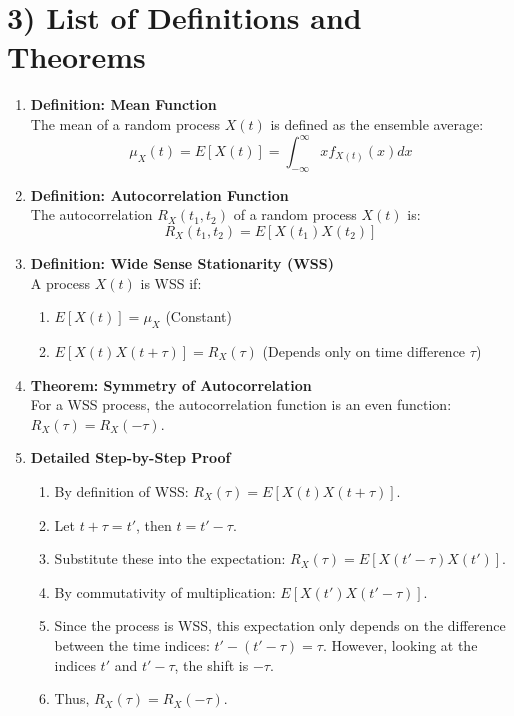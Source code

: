 \documentclass[11pt]{article}
\begin{document}
\section*{3) List of Definitions and Theorems} 
\begin{enumerate}
    \item \textbf{Definition: Mean Function} \\
    The mean of a random process $X(t)$ is defined as the ensemble average:
    \[ \mu_X(t) = E[X(t)] = \int_{-\infty}^{\infty} x f_{X(t)}(x) dx \]

    \item \textbf{Definition: Autocorrelation Function} \\
    The autocorrelation $R_X(t_1, t_2)$ of a random process $X(t)$ is:
    \[ R_X(t_1, t_2) = E[X(t_1)X(t_2)] \]

    \item \textbf{Definition: Wide Sense Stationarity (WSS)} \\
    A process $X(t)$ is WSS if:
    \begin{enumerate}
        \item[1.] $E[X(t)] = \mu_X$ (Constant)
        \item[2.] $E[X(t)X(t+\tau)] = R_X(\tau)$ (Depends only on time difference $\tau$)
    \end{enumerate}

    \item \textbf{Theorem: Symmetry of Autocorrelation} \\
    For a WSS process, the autocorrelation function is an even function: $R_X(\tau) = R_X(-\tau)$.

    \item \textbf{Detailed Step-by-Step Proof}
    \begin{enumerate}
        \item[1.] By definition of WSS: $R_X(\tau) = E[X(t)X(t+\tau)]$.
        \item[2.] Let $t + \tau = t'$, then $t = t' - \tau$.
        \item[3.] Substitute these into the expectation: $R_X(\tau) = E[X(t'-\tau)X(t')]$.
        \item[4.] By commutativity of multiplication: $E[X(t')X(t'-\tau)]$.
        \item[5.] Since the process is WSS, this expectation only depends on the difference between the time indices: $t' - (t'-\tau) = \tau$. However, looking at the indices $t'$ and $t'-\tau$, the shift is $-\tau$. 
        \item[6.] Thus, $R_X(\tau) = R_X(-\tau)$.
    \end{enumerate}
\end{enumerate}
\end{document}
